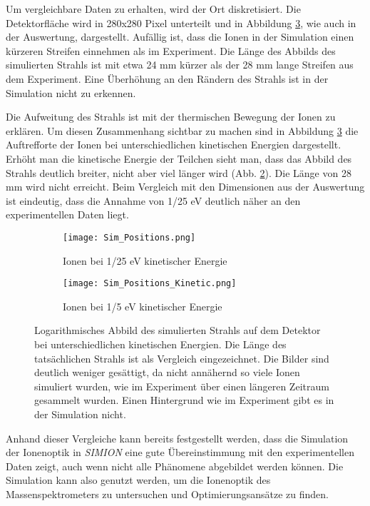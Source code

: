Um vergleichbare Daten zu erhalten, wird der Ort diskretisiert. Die Detektorfläche wird in 280x280 Pixel unterteilt und in Abbildung \ref{fig:sim_pos_both}, wie auch in der Auswertung, dargestellt. Aufällig ist, dass die Ionen in der Simulation einen kürzeren Streifen einnehmen als im Experiment. Die Länge des Abbilds des simulierten Strahls ist mit etwa 24 mm kürzer als der 28 mm lange Streifen aus dem Experiment. Eine Überhöhung an den Rändern des Strahls ist in der Simulation nicht zu erkennen.

Die Aufweitung des Strahls ist mit der thermischen Bewegung der Ionen zu erklären. Um diesen Zusammenhang sichtbar zu machen sind in Abbildung \ref{fig:sim_pos_both} die Auftrefforte der Ionen bei unterschiedlichen kinetischen Energien dargestellt. Erhöht man die kinetische Energie der Teilchen sieht man, dass das Abbild des Strahls deutlich breiter, nicht aber viel länger wird (Abb. \ref{fig:sim_pos_kinetic}). Die Länge von 28 mm wird nicht erreicht. Beim Vergleich mit den Dimensionen aus der Auswertung ist eindeutig, dass die Annahme von 1/25 eV deutlich näher an den experimentellen Daten liegt. 

\begin{figure}
    \centering
    \begin{subfigure}{.43\textwidth}
        \centering
        \texttt{[image: Sim\_Positions.png]}
        \caption{Ionen bei 1/25 eV kinetischer Energie}
        \label{fig:sim_pos}
    \end{subfigure}%
    \hfill
    \begin{subfigure}{.45\textwidth}
        \centering
        \texttt{[image: Sim\_Positions\_Kinetic.png]}
        \caption{Ionen bei 1/5 eV kinetischer Energie}
        \label{fig:sim_pos_kinetic}
    \end{subfigure}
    \caption[Simuliertes Abbild des Strahls auf dem Detektor bei verschiedenen Energien]{Logarithmisches Abbild des simulierten Strahls auf dem Detektor bei unterschiedlichen kinetischen Energien. Die Länge des tatsächlichen Strahls ist als Vergleich eingezeichnet. Die Bilder sind deutlich weniger gesättigt, da nicht annähernd so viele Ionen simuliert wurden, wie im Experiment über einen längeren Zeitraum gesammelt wurden. Einen Hintergrund wie im Experiment gibt es in der Simulation nicht.}
    \label{fig:sim_pos_both}
\end{figure}

Anhand dieser Vergleiche kann bereits festgestellt werden, dass die Simulation der Ionenoptik in \textit{SIMION} eine gute Übereinstimmung mit den experimentellen Daten zeigt, auch wenn nicht alle Phänomene abgebildet werden können. Die Simulation kann also genutzt werden, um die Ionenoptik des Massenspektrometers zu untersuchen und Optimierungsansätze zu finden.

